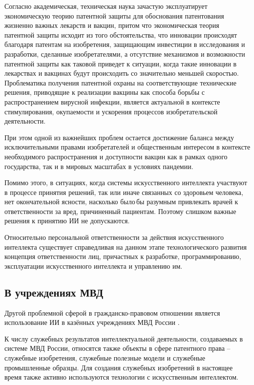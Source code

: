 Согласно  \cite{vac} академическая, техническая наука зачастую эксплуатирует экономическую теорию патентной защиты для
обоснования патентования жизненно важных лекарств и вакцин, притом что экономическая теория патентной
защиты исходит из того обстоятельства, что инновации происходят благодаря патентам на изобретения,
защищающим инвестиции в исследования и разработки, сделанные изобретателями, а отсутствие механизмов
и возможности патентной защиты как таковой приведет к ситуации, когда такие инновации в лекарствах и
вакцинах будут происходить со значительно меньшей скоростью. Проблематика получения патентной охраны
на соответствующие технические решения, приводящие к реализации вакцины как способа борьбы с распространением
вирусной инфекции, является актуальной в контексте стимулирования, окупаемости и ускорения процессов
изобретательской деятельности.

При этом одной из важнейших проблем остается достижение баланса между исключительными правами изобретателей
и общественным интересом в контексте необходимого распространения и доступности вакцин как в рамках одного
государства, так и в мировых масштабах в условиях пандемии.

Помимо этого, в ситуациях, когда системы искусственного интеллекта участвуют в процессе принятия решений,
так или иначе связанных со здоровьем человека, нет окончательной ясности, насколько было бы разумным
привлекать врачей к ответственности за вред, причиненный пациентам. Поэтому слишком важные решения
к принятию ИИ не допускаются.

Относительно персональной ответственности за действия искусственного интеллекта существует справедливая
на данном этапе технологического развития концепция ответственности лиц, причастных к разработке,
программированию, эксплуатации искусственного интеллекта и управлению им.

\subsection{В учреждениях МВД}
Другой проблемной сферой в гражданско-правовом отношении является использование ИИ в казённых
учреждениях МВД России \cite{civil}.

К числу служебных результатов интеллектуальной деятельности, создаваемых в системе МВД России,
относятся также объекты в сфере патентного права – служебные изобретения, служебные полезные модели
и служебные промышленные образцы. Для создания служебных изобретений в настоящее время также активно
используются технологии с искусственным интеллектом.

